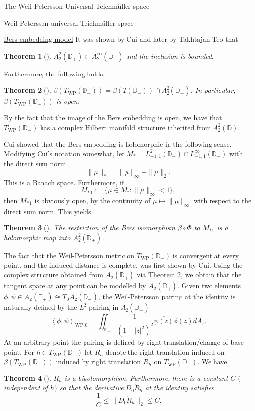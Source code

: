 \documentclass[12pt]{amsart}
\newcommand{\disk}{\ensuremath{\mathbb{D}} } %
\theoremstyle{plain}
\newtheorem{theorem}{Theorem}[section]
\theoremstyle{definition}
\theoremstyle{remark}
\numberwithin{equation}{section} %
\numberwithin{figure}{section} %
\begin{document}
\begin{section}{The Weil-Petersson Universal Teichm\"uller space}
\begin{subsection}{Weil-Petersson universal Teichm\"uller space}
\begin{subsubsection}{\underline{Bers embedding model}}
  {It was shown by Cui \cite{Cui} and later by Takhtajan-Teo  \cite{Takhtajan_Teo_Memoirs} that}
  \begin{theorem}[\cite{Cui,Takhtajan_Teo_Memoirs}]   \label{th:disk_inclusion_bounded}
$A_2^2(\disk_+) \subset A_2^\infty(\disk_+)$
and the inclusion is bounded.
\end{theorem} 
 
Furthermore, the following holds. 
\begin{theorem}[\cite{Cui,Takhtajan_Teo_Memoirs}]  \label{th:Bers_univ_WP}
 $\beta(T_{\mathrm{WP}}(\disk_-))= \beta(T(\disk_-)) \cap A_2^2(\disk_+)$.  In particular,
 $\beta(T_{\mathrm{WP}}(\disk_-))$ is open.
\end{theorem}
By the fact that the image of the Bers embedding is open, we have that $T_{\mathrm{WP}}(\disk_-)$ has a complex Hilbert manifold structure inherited from $A_2^2(\disk)$.  

 Cui showed that the Bers embedding is holomorphic in the following sense. Modifying Cui's notation somewhat, let $M_* = L_{-1,1}^2(\disk_-)\cap L_{-1,1}^\infty(\disk_-)$ with the direct sum norm 
 \[   \| \mu \|_*= \| \mu \|_\infty + \| \mu \|_2. \]
 This is a Banach space.  Furthermore, if 
 \[ {M_*}_1 := \{ \mu \in M_* : \| \mu \|_\infty <1 \},  \]
then ${M_*}_1$ is obviously open, by the continuity of $\mu \mapsto \| \mu \|_{\infty}$ with respect to the direct sum norm. 
This yields  
 \begin{theorem}[\cite{Cui}] \label{th:Cui_Bers_starting_in_M} The restriction of the Bers isomorphism $\beta \circ \Phi$ to ${M_*}_1$ is a holomorphic map into $A_2^2(\disk_+)$.
 \end{theorem}

 The fact that the Weil-Petersson metric on $T_{\mathrm{WP}}(\disk_-)$ is convergent at every point, and the induced distance is complete, was first shown by Cui. Using the complex structure obtained from $A_2(\disk_+)$ via Theorem \ref{th:Bers_univ_WP}, we obtain that the tangent space at any point can be modelled by $A_2(\disk_+)$.  Given two elements $\phi,\psi \in A_2(\disk_+) \cong T_0 A_2(\disk_+)$, the Weil-Petersson pairing at the identity is naturally defined by the $L^2$ pairing in $A_2(\disk_+)$
 \[   \left< \phi,\psi \right>_{\mathrm{WP},0} = \iint_{\disk_+} \frac{1}{(1-|z|^2)^2} \overline{\psi(z)} \phi(z) dA_z.   \]
 At an arbitrary point the pairing is defined by right translation/change of base point. For $h \in T_{\mathrm{WP}}(\disk_-)$ let $\check{R}_h$ denote the right translation induced on $\beta(T_{\mathrm{WP}}(\disk_-))$ induced by right translation $R_{h}$ on $T_{\mathrm{WP}}(\disk_-)$. 
 We have 
 \begin{theorem}[\cite{Cui}] \label{th:Cui_right_translation}
   $\check{R}_h$ is a biholomorphism. Furthermore, there is a constant $C$ $($independent of $h$$)$ so that the derivative $D_{0}  \check{R}_{h}$ at the identity satisfies
   \[   \frac{1}{C} \leq \| D_{0} \check{R}_{h} \|_2 \leq C.  \] 
 \end{theorem} 
 

\end{subsubsection}
\end{subsection}
\end{section}
\end{document}
